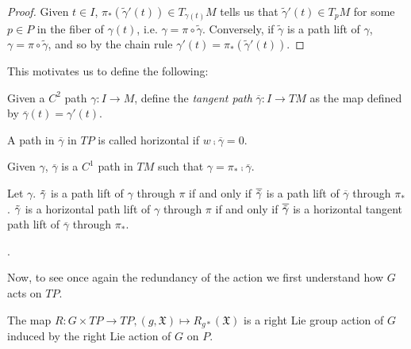 \begin{proof}
Given $t \in I$, $\pi_*(\tilde{\gamma}'(t)) \in T_{\gamma(t)}M$ tells us that $\tilde{\gamma}'(t) \in T_p M$ for some $p \in P$ in the fiber of $\gamma(t)$, i.e. $\gamma = \pi \circ \tilde{\gamma}$. Conversely, if $\tilde{\gamma}$ is a path lift of $\gamma$, $\gamma = \pi \circ \tilde{\gamma}$, and so by the chain rule $\gamma'(t) = \pi_*(\tilde{\gamma}'(t))$.
\end{proof}

This motivates us to define the following:

\begin{definition}
Given a $C^2$ path $\gamma: I \to M$, define the \emph{tangent path} $\overline \gamma:I \to TM$ as the map defined by $\overline \gamma(t) = \gamma'(t)$. 
\end{definition}

\begin{definition}
A path in $\overline{\gamma}$ in $TP$ is called horizontal if $w \comp \overline{\gamma} = 0$.
\end{definition}

\begin{lemma}
Given $\gamma$, $\overline \gamma$ is a $C^1$ path in $TM$ such that $\gamma = \pi_{*} \comp \overline{\gamma}$.
\end{lemma}

\begin{theorem}
Let $\gamma$. $\Tilde{\gamma}$ is a path lift of $\gamma$ through $\pi$ if and only if $\overline{\Tilde{\gamma}}$ is a path lift of $\overline{\gamma}$ through $\pi_*$. $\Tilde{\gamma}$ is a horizontal path lift of $\gamma$ through $\pi$ if and only if $\overline{\Tilde{\gamma}}$ is a horizontal tangent path lift of $\overline{\gamma}$ through $\pi_*$.
\end{theorem}

. 

Now, to see once again the redundancy of the action we first understand how $G$ acts on $TP$.

\begin{proposition}
The map $R : G \times TP \to TP, (g, \mathfrak{X}) \mapsto R_{g*}(\mathfrak X)$ is a right Lie group action of $G$ induced by the right Lie action of $G$ on $P$.
\end{proposition}

